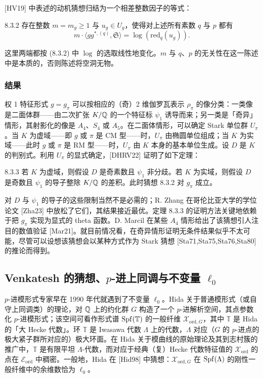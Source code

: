 [HV19] 中表述的动机猜想归结为一个相差整数因子的等式：

\begin{conj}{8.3.2}\label{thm:a6-05-16}
存在整数 $m=m_g\ge1$ 与 $u_g\in U_g$，使得对上述所有素数 $q$ 与 $p$ 都有
\[
m\cdot\langle gg^{*,(q)},\mathfrak S\rangle=\log(\mathrm{red}_q(u_g)).
\]
\end{conj}

这里两端都按 (8.3.2) 中 $\log$ 的选取线性地变化。$m$ 与 $q$、$p$ 的无关性在这一陈述中是本质的，否则陈述将空洞无物。

\subsubsection{结果}

权 1 特征形式 $g=g_\pi$ 可以按相应的（奇）2 维伽罗瓦表示 $\rho_\pi$ 的像分类：一类像是二面体群——由二次扩张 $K/\mathbb{Q}$ 的一个特征标 $\psi_1$ 诱导而来；另一类是「奇异」情形，其射影化的像是 $A_4$、$S_4$ 或 $A_5$。在二面体情形，可以确定 Stark 单位群 $U_\pi$。当 $K$ 为虚域——即 $g$ 或 $\pi$ 是 CM 型——时，$U_\pi$ 由椭圆单位组成；当 $K$ 为实域——此时 $g$ 或 $\pi$ 是 RM 型——时，$U_\pi$ 由 $K$ 本身的基本单位生成。设 $D$ 是 $K$ 的判别式。利用 $U_\pi$ 的显式确定，[DHRV22] 证明了如下定理：

\begin{thm}{8.3.3}\label{thm:a6-05-17}
若 $K$ 为虚域，则假设 $D$ 是奇素数且 $\psi_1$ 非分歧。若 $K$ 为实域，则假设 $D$ 是奇数且 $\psi_1$ 的导子整除 $K/\mathbb{Q}$ 的差积。此时猜想 8.3.2 对 $g_\pi$ 成立。
\end{thm}

对 $D$ 与 $\psi_1$ 的导子的这些限制当然不是必需的；R. Zhang 在哥伦比亚大学的学位论文 [Zha23] 中放松了它们，其结果接近最优。定理 8.3.3 的证明方法关键地依赖于把 $g_\pi$ 实现为显式的 theta 函数。D. Marcil 在某些 $A_4$ 情形给出了该猜想引人注目的数值验证 [Mar21]。就目前情况看，在奇异情形证明无条件结果似乎不太可能，尽管可以设想该猜想会以某种方式作为 Stark 猜想 [Sta71,Sta75,Sta76,Sta80] 的推论而得到。

\subsection{Venkatesh 的猜想、$p$-进上同调与不变量 $\ell_0$}

$p$-进模形式专家早在 1990 年代就遇到了不变量 $\ell_0$。Hida 关于普通模形式（或自守上同调类）的理论，对 $\mathbb{Q}$ 上的约化群 $G$ 构造了一个 $p$-进解析空间，其点参数化 $p$-进模形式；该空间可看作形式谱 $\operatorname{Spf}(\mathbb T)$ 的一般纤维 $\mathcal X_{\mathrm{ord},G}$，其中 $\mathbb T$ 是 Hida 的「大 Hecke 代数」。环 $\mathbb T$ 是 Iwasawa 代数 $\Lambda$ 上的代数，$\Lambda$ 对应（$G$ 的 $p$-进点的极大紧子群所对应的）极大环面。在 Hida 关于模曲线的原始理论及其到志村簇的推广中，$\mathbb T$ 是有限平坦 $\Lambda$-代数，而对应于经典（复）Hecke 代数特征值的 $\mathcal X_{\mathrm{ord}}$ 的点在 $\mathcal E_{\mathrm{ord}}$ 中稠密。一般地，Hida 在 [Hid98] 中猜想：$\mathcal X_{\mathrm{ord},G}$ 在 $\operatorname{Spf}(\Lambda)$ 的刚性一般纤维中的余维数恰为 $\ell_0$。

